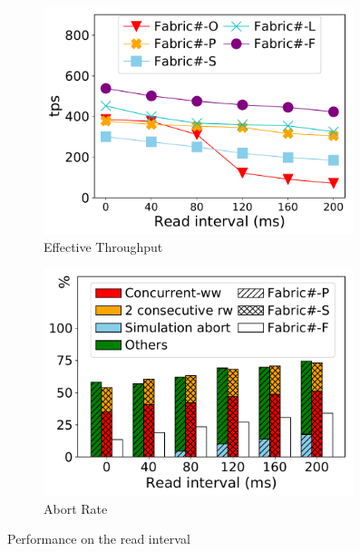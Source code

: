 \begin{figure}[t]
	\centering
    \begin{subfigure}{0.45\textwidth}
      \includegraphics[width=0.99\textwidth]{chart/txn/complex_readinterval_thruput.pdf}
      \caption{Effective Throughput}
      \label{chart:txn:readinterval:thruput}
    \end{subfigure}
    \begin{subfigure}{0.45\textwidth}
      \includegraphics[width=0.99\textwidth]{chart/txn/complex_readinterval_abort.pdf}
      \caption{Abort Rate}
      \label{chart:txn:readinterval:abort}
    \end{subfigure}
    \caption{Performance on the read interval}
    \label{chart:txn:readinterval}
\end{figure}